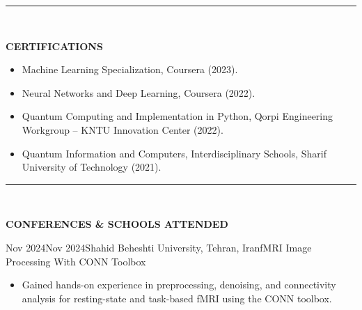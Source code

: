 \documentclass[11pt, b4paper]{cv}
\begin{document}

\vspace{-0.15in}
\rule{\textwidth}{1pt}\\
\vspace{-0.15in}

\textbf{CERTIFICATIONS}
\vspace{-0.1in}

\begin{itemize}
	\item Machine Learning Specialization, Coursera (2023).
	\item Neural Networks and Deep Learning, Coursera (2022).
	\item Quantum Computing and Implementation in Python, Qorpi Engineering Workgroup – KNTU Innovation Center (2022).
	\item Quantum Information and Computers, Interdisciplinary Schools, Sharif University of Technology (2021).
\end{itemize}

\vspace{-0.15in}
\rule{\textwidth}{1pt}\\
\vspace{-0.15in}

\textbf{CONFERENCES \& SCHOOLS ATTENDED}

\begin{school}{Nov 2024}{Nov 2024}{Shahid Beheshti University, Tehran, Iran}{fMRI Image Processing With CONN Toolbox}
	\begin{itemize}
	    \item Gained hands-on experience in preprocessing, denoising, and connectivity analysis for resting-state and task-based fMRI using the CONN toolbox.
	\end{itemize}
\end{school}
\vspace{-0.1in}
\end{document}
